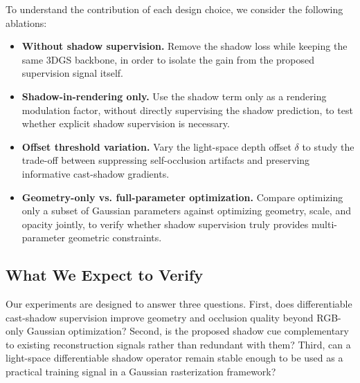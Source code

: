 To understand the contribution of each design choice, we consider the following ablations:
\begin{itemize}
    \item \textbf{Without shadow supervision.} Remove the shadow loss while keeping the same 3DGS backbone, in order to isolate the gain from the proposed supervision signal itself.
    \item \textbf{Shadow-in-rendering only.} Use the shadow term only as a rendering modulation factor, without directly supervising the shadow prediction, to test whether explicit shadow supervision is necessary.
    \item \textbf{Offset threshold variation.} Vary the light-space depth offset $\delta$ to study the trade-off between suppressing self-occlusion artifacts and preserving informative cast-shadow gradients.
    \item \textbf{Geometry-only vs. full-parameter optimization.} Compare optimizing only a subset of Gaussian parameters against optimizing geometry, scale, and opacity jointly, to verify whether shadow supervision truly provides multi-parameter geometric constraints.
\end{itemize}

\subsection{What We Expect to Verify}

Our experiments are designed to answer three questions. First, does differentiable cast-shadow supervision improve geometry and occlusion quality beyond RGB-only Gaussian optimization? Second, is the proposed shadow cue complementary to existing reconstruction signals rather than redundant with them? Third, can a light-space differentiable shadow operator remain stable enough to be used as a practical training signal in a Gaussian rasterization framework?
